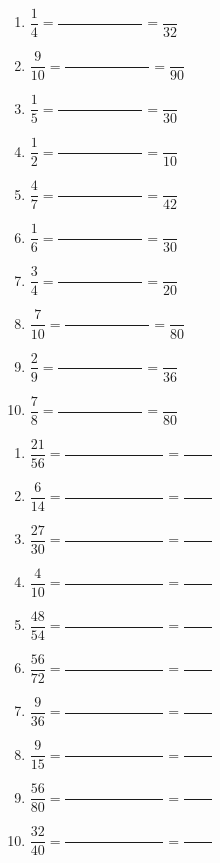 \documentclass[a4paper,11pt,fleqn]{article}
\begin{document}

\begin{multicols}{2}
\begin{enumerate}[itemsep=2em]
	\item $ \dfrac{1}{4} = \dfrac{\phantom{000000000000}}{\phantom{000000000000}} = \dfrac{}{32} $
	\item $ \dfrac{9}{10} = \dfrac{\phantom{000000000000}}{\phantom{000000000000}} = \dfrac{}{90} $
	\item $ \dfrac{1}{5} = \dfrac{\phantom{000000000000}}{\phantom{000000000000}} = \dfrac{}{30} $
	\item $ \dfrac{1}{2} = \dfrac{\phantom{000000000000}}{\phantom{000000000000}} = \dfrac{}{10} $
	\item $ \dfrac{4}{7} = \dfrac{\phantom{000000000000}}{\phantom{000000000000}} = \dfrac{}{42} $
	\item $ \dfrac{1}{6} = \dfrac{\phantom{000000000000}}{\phantom{000000000000}} = \dfrac{}{30} $
	\item $ \dfrac{3}{4} = \dfrac{\phantom{000000000000}}{\phantom{000000000000}} = \dfrac{}{20} $
	\item $ \dfrac{7}{10} = \dfrac{\phantom{000000000000}}{\phantom{000000000000}} = \dfrac{}{80} $
	\item $ \dfrac{2}{9} = \dfrac{\phantom{000000000000}}{\phantom{000000000000}} = \dfrac{}{36} $
	\item $ \dfrac{7}{8} = \dfrac{\phantom{000000000000}}{\phantom{000000000000}} = \dfrac{}{80} $
\end{enumerate}
\end{multicols}


\begin{multicols}{2}
\begin{enumerate}[itemsep=2em]
	\item $ \dfrac{21}{56} = \dfrac{\phantom{00000000000000}}{} = \dfrac{\phantom{0000}}{} $
	\item $ \dfrac{6}{14} = \dfrac{\phantom{00000000000000}}{} = \dfrac{\phantom{0000}}{} $
	\item $ \dfrac{27}{30} = \dfrac{\phantom{00000000000000}}{} = \dfrac{\phantom{0000}}{} $
	\item $ \dfrac{4}{10} = \dfrac{\phantom{00000000000000}}{} = \dfrac{\phantom{0000}}{} $
	\item $ \dfrac{48}{54} = \dfrac{\phantom{00000000000000}}{} = \dfrac{\phantom{0000}}{} $
	\item $ \dfrac{56}{72} = \dfrac{\phantom{00000000000000}}{} = \dfrac{\phantom{0000}}{} $
	\item $ \dfrac{9}{36} = \dfrac{\phantom{00000000000000}}{} = \dfrac{\phantom{0000}}{} $
	\item $ \dfrac{9}{15} = \dfrac{\phantom{00000000000000}}{} = \dfrac{\phantom{0000}}{} $
	\item $ \dfrac{56}{80} = \dfrac{\phantom{00000000000000}}{} = \dfrac{\phantom{0000}}{} $
	\item $ \dfrac{32}{40} = \dfrac{\phantom{00000000000000}}{} = \dfrac{\phantom{0000}}{} $
\end{enumerate}
\end{multicols}
\end{document}
